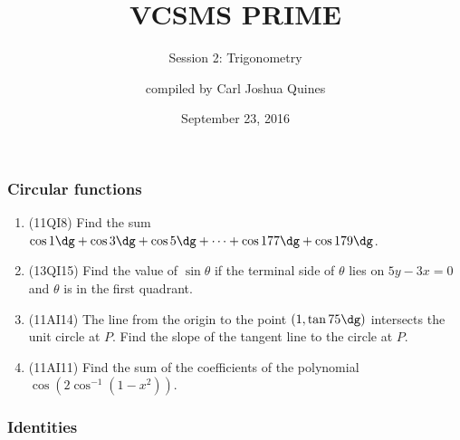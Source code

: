 \documentclass[10pt,paper=letter]{scrartcl}
\begin{document}
\title{VCSMS PRIME}
\subtitle{Session 2: Trigonometry}
\author{compiled by Carl Joshua Quines}
\date{September 23, 2016}

\maketitle

\subsubsection*{Circular functions}

\begin{enumerate}

\item (11QI8) Find the sum $\cos 1\dg + \cos 3\dg + \cos 5\dg + \cdots + \cos 177\dg + \cos 179\dg$.

\item (13QI15) Find the value of $\sin \theta$ if the terminal side of $\theta$ lies on $5y - 3x = 0$ and $\theta$ is in the first quadrant.

\item (11AI14) The line from the origin to the point $(1, \tan 75\dg)$ intersects the unit circle at $P$. Find the slope of the tangent line to the circle at $P$.

\item (11AI11) Find the sum of the coefficients of the polynomial $\cos(2 \cos^{-1}(1 - x^2))$.

\end{enumerate}

\subsubsection*{Identities}
\end{document}
